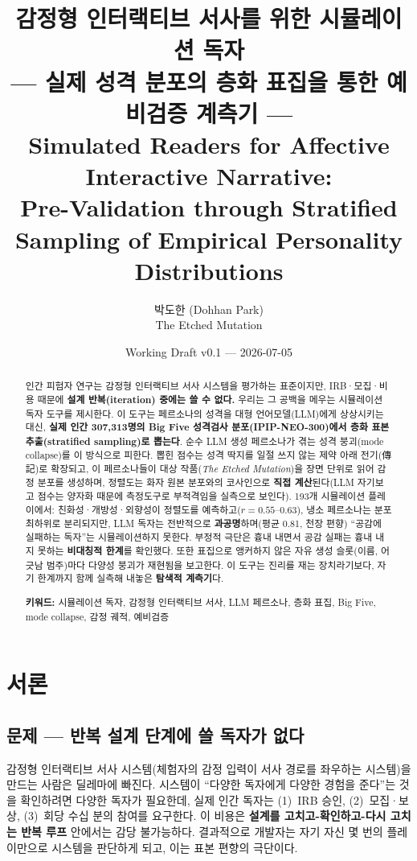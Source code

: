 \documentclass[11pt, a4paper]{article}
\title{%
  감정형 인터랙티브 서사를 위한 시뮬레이션 독자\\
  \large --- 실제 성격 분포의 층화 표집을 통한 예비검증 계측기 ---\\[0.8em]
  \normalsize Simulated Readers for Affective Interactive Narrative:\\
  Pre-Validation through Stratified Sampling of Empirical Personality Distributions
}
\author{박도한 (Dohhan Park)\\ \small The Etched Mutation}
\date{Working Draft v0.1 --- 2026-07-05}
\begin{document}
\maketitle

\begin{abstract}
\noindent 인간 피험자 연구는 감정형 인터랙티브 서사 시스템을 평가하는 표준이지만, IRB·모집·비용 때문에 \textbf{설계 반복(iteration) 중에는 쓸 수 없다.} 우리는 그 공백을 메우는 시뮬레이션 독자 도구를 제시한다. 이 도구는 페르소나의 성격을 대형 언어모델(LLM)에게 상상시키는 대신, \textbf{실제 인간 307{,}313명의 Big Five 성격검사 분포(IPIP-NEO-300)에서 층화 표본추출(stratified sampling)로 뽑는다}. 순수 LLM 생성 페르소나가 겪는 성격 붕괴(mode collapse)를 이 방식으로 피한다. 뽑힌 점수는 성격 딱지를 일절 쓰지 않는 제약 아래 전기(傳記)로 확장되고, 이 페르소나들이 대상 작품(\textit{The Etched Mutation})을 장면 단위로 읽어 감정 분포를 생성하며, 정렬도는 화자 원본 분포와의 코사인으로 \textbf{직접 계산}된다(LLM 자기보고 점수는 양자화 때문에 측정도구로 부적격임을 실측으로 보인다). 193개 시뮬레이션 플레이에서: 친화성·개방성·외향성이 정렬도를 예측하고($r = 0.55$--$0.63$), 냉소 페르소나는 분포 최하위로 분리되지만, LLM 독자는 전반적으로 \textbf{과공명}하며(평균 0.81, 천장 편향) ``공감에 실패하는 독자''는 시뮬레이션하지 못한다. 부정적 극단은 흉내 내면서 공감 실패는 흉내 내지 못하는 \textbf{비대칭적 한계}를 확인했다. 또한 표집으로 앵커하지 않은 자유 생성 슬롯(이름, 어긋남 범주)마다 다양성 붕괴가 재현됨을 보고한다. 이 도구는 진리를 재는 장치라기보다, 자기 한계까지 함께 실측해 내놓은 \textbf{탐색적 계측기}다.

\medskip
\noindent\textbf{키워드:} 시뮬레이션 독자, 감정형 인터랙티브 서사, LLM 페르소나, 층화 표집, Big Five, mode collapse, 감정 궤적, 예비검증
\end{abstract}

\section{서론}

\subsection{문제 --- 반복 설계 단계에 쓸 독자가 없다}

감정형 인터랙티브 서사 시스템(체험자의 감정 입력이 서사 경로를 좌우하는 시스템)을 만드는 사람은 딜레마에 빠진다. 시스템이 ``다양한 독자에게 다양한 경험을 준다''는 것을 확인하려면 다양한 독자가 필요한데, 실제 인간 독자는 (1)~IRB 승인, (2)~모집·보상, (3)~회당 수십 분의 참여를 요구한다. 이 비용은 \textbf{설계를 고치고-확인하고-다시 고치는 반복 루프} 안에서는 감당 불가능하다. 결과적으로 개발자는 자기 자신 몇 번의 플레이만으로 시스템을 판단하게 되고, 이는 표본 편향의 극단이다.
\end{document}
